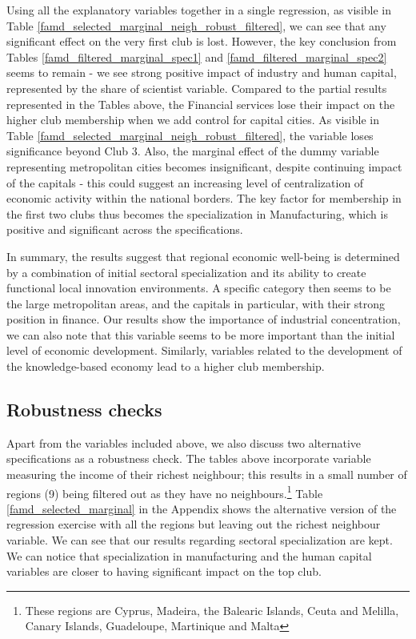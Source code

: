 \documentclass[11pt]{article}
\begin{document}
Using all the explanatory variables together in a single regression, as visible in Table \ref{famd_selected_marginal_neigh_robust_filtered}, we can see that any significant effect on the very first club is lost. However, the key conclusion from Tables \ref{famd_filtered_marginal_spec1}  and \ref{famd_filtered_marginal_spec2} seems to remain - we see strong positive impact of industry and human capital, represented by the share of scientist variable.  Compared to the partial results represented in the Tables above, the Financial services lose their impact on the higher club membership when we add control for capital cities. As visible in Table \ref{famd_selected_marginal_neigh_robust_filtered}, the variable loses significance beyond Club 3. Also, the marginal effect of the dummy variable representing metropolitan cities becomes insignificant, despite continuing impact of the capitals - this could suggest an increasing level of centralization of economic activity within the national borders. The key factor for membership in the first two clubs thus becomes the specialization in Manufacturing, which is positive and significant across the specifications.

In summary, the results suggest that regional economic well-being is determined by a combination of initial sectoral specialization and its ability to create functional local innovation environments. A specific category then seems to be the large metropolitan areas, and the capitals in particular, with their strong position in finance. Our results show the importance of industrial concentration, we can also note that this variable seems to be more important than the initial level of economic development. Similarly, variables related to the development of the knowledge-based economy lead to a higher club membership.

\subsection{Robustness checks}
Apart from the variables included above, we also discuss two alternative specifications as a robustness check. The tables above incorporate variable measuring the income of their richest neighbour; this results in a small number of regions (9) being filtered out as they have no neighbours.\footnote{These regions are Cyprus, Madeira, the Balearic Islands, Ceuta and Melilla, Canary Islands, Guadeloupe, Martinique and Malta} Table \ref{famd_selected_marginal} in the Appendix shows the alternative version of the regression exercise with all the regions but leaving out the richest neighbour variable. We can see that our results regarding sectoral specialization are kept. We can notice that specialization in manufacturing and the human capital variables are closer to having significant impact on the top club.
\end{document}
